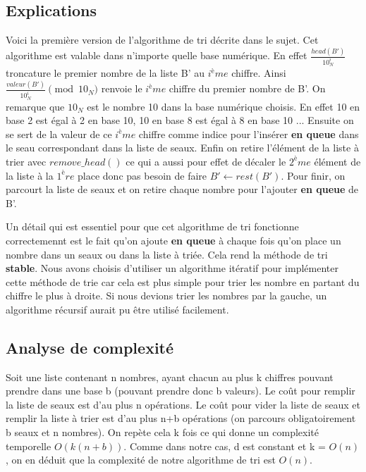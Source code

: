 \documentclass{article}
\begin{document}
\subsection{Explications}
Voici la première version de l'algorithme de tri décrite dans le sujet. Cet algorithme est valable dans n'importe quelle base numérique. En effet $\frac{head(B')}{10_N^i}$
troncature le premier nombre de la liste B' au $i^ème$ chiffre. Ainsi $\frac{valeur(B')}{10_N^i} \pmod{10_N}$ renvoie le $i^ème$ chiffre du premier nombre de B'. On remarque que $10_N$ est le nombre 10 dans la base numérique choisis. En effet 10 en base 2 est égal à 2 en base 10, 10 en base 8 est égal à 8 en base 10 ...
\newline
Ensuite on se sert de la valeur de ce $i^ème$ chiffre comme indice pour l'insérer \textbf{en queue} dans le seau correspondant dans la liste de seaux. 
\newline
Enfin on retire l'élément de la liste à trier avec $remove\_head()$ ce qui a aussi pour effet de décaler le $2^ème$ élément de la liste à la $1^ère$ place donc pas besoin de faire $B' \gets rest(B')$.
\newline
Pour finir, on parcourt la liste de seaux et on retire chaque nombre pour l'ajouter \textbf{en queue} de B'.

Un détail qui est essentiel pour que cet algorithme de tri fonctionne correctemennt est le fait qu'on ajoute \textbf{en queue} à chaque fois qu'on place un nombre dans un seaux ou dans la liste à triée. Cela rend la méthode de tri \textbf{stable}. 
\newline
Nous avons choisis d'utiliser un algorithme itératif pour implémenter cette méthode de trie car cela est plus simple pour trier les nombre en partant du chiffre le plus à droite. Si nous devions trier les nombres par la gauche, un algorithme récursif aurait pu être utilisé facilement.

\subsection{Analyse de complexité}

Soit une liste contenant n nombres, ayant chacun au plus k chiffres pouvant prendre dans une base b (pouvant prendre donc b valeurs). Le coût pour remplir la liste de seaux est d'au plus n opérations. Le coût pour vider la liste de seaux et remplir la liste à trier est d'au plus n+b opérations (on parcours obligatoirement b seaux et n nombres). On repète cela k fois ce qui donne un complexité temporelle $O(k(n+b))$.
\newline
Comme dans notre cas, d est constant et k = $O(n)$, on en déduit que la complexité de notre algorithme de tri est $O(n)$.
\newline
\end{document}
